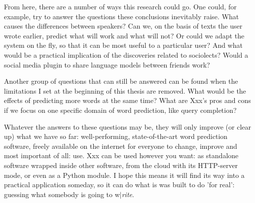 \documentclass[11pt]{article}
\begin{document}
From here, there are a number of ways this research could go. One could, for example, try to answer the questions these conclusions inevitably raise. What causes the differences between speakers? Can we, on the basis of texts the user wrote earlier, predict what will work and what will not? Or could we adapt the system on the fly, so that it can be most useful to a particular user? And what would be a practical implication of the discoveries related to sociolects? Would a social media plugin to share language models between friends work? 

Another group of questions that can still be answered can be found when the limitations I set at the beginning of this thesis are removed. What would be the effects of predicting more words at the same time? What are Xxx's pros and cons if we focus on one specific domain of word prediction, like query completion?

Whatever the answers to these questions may be, they will only improve (or clear up) what we have so far: well-performing, state-of-the-art word prediction software, freely available on the internet for everyone to change, improve and most important of all: use. Xxx can be used however you want: as standalone software wrapped inside other software, from the cloud with its HTTP-server mode, or even as a Python module. I hope this means it will find its way into a practical application someday, so it can do what is was built to do 'for real': guessing what somebody is going to w$|$\emph{rite}.


{}

\end{document}
